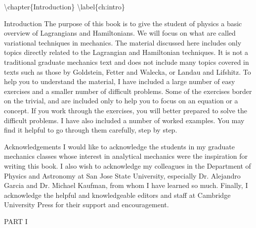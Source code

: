 \textbackslash{}chapter\{Introduction\}
\textbackslash{}label\{ch:intro\}

Introduction
The purpose of this book is to give the student of physics a basic overview of
Lagrangians and Hamiltonians. We will focus on what are called variational
techniques in mechanics. The material discussed here includes only topics
directly related to the Lagrangian and Hamiltonian techniques. It is not a traditional graduate mechanics text and does not include many topics covered in
texts such as those by Goldstein, Fetter and Walecka, or Landau and Lifshitz.
To help you to understand the material, I have included a large number of easy
exercises and a smaller number of difficult problems. Some of the exercises
border on the trivial, and are included only to help you to focus on an equation
or a concept. If you work through the exercises, you will better prepared to
solve the difficult problems. I have also included a number of worked examples. You may find it helpful to go through them carefully, step by step.

Acknowledgements
I would like to acknowledge the students in my graduate mechanics classes
whose interest in analytical mechanics were the inspiration for writing this
book. I also wish to acknowledge my colleagues in the Department of Physics
and Astronomy at San Jose State University, especially Dr. Alejandro Garcia
and Dr. Michael Kaufman, from whom I have learned so much. Finally, I
acknowledge the helpful and knowledgeable editors and staff at Cambridge
University Press for their support and encouragement.

PART I